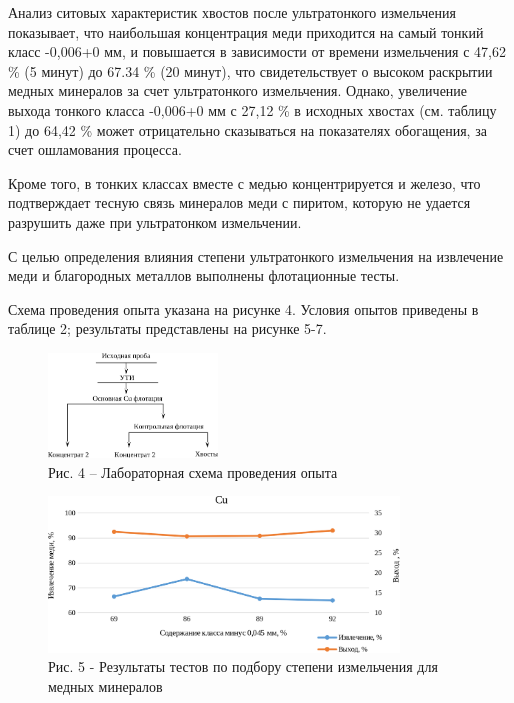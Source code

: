 \begin{multicols}{2}
Анализ ситовых характеристик хвостов после ультратонкого измельчения
показывает, что наибольшая концентрация меди приходится на самый тонкий
класс -0,006+0 мм, и повышается в зависимости от времени измельчения с
47,62 \% (5 минут) до 67.34 \% (20 минут), что свидетельствует о высоком
раскрытии медных минералов за счет ультратонкого измельчения. Однако,
увеличение выхода тонкого класса -0,006+0 мм с 27,12 \% в исходных
хвостах (см. таблицу 1) до 64,42 \% может отрицательно сказываться на
показателях обогащения, за счет ошламования процесса.

Кроме того, в тонких классах вместе с медью концентрируется и железо,
что подтверждает тесную связь минералов меди с пиритом, которую не
удается разрушить даже при ультратонком измельчении.

С целью определения влияния степени ультратонкого измельчения на
извлечение меди и благородных металлов выполнены флотационные тесты.

Схема проведения опыта указана на рисунке 4. Условия опытов приведены в
таблице 2; результаты представлены на рисунке 5-7.
\end{multicols}

\begin{figure}[H]
	\centering
	\includegraphics[width=0.4\textwidth]{assets/300.2}
	\caption*{Рис. 4 -- Лабораторная схема проведения опыта}
\end{figure}

\begin{figure}[H]
	\centering
	\includegraphics[width=0.83\textwidth]{assets/300.3}
	\caption*{Рис. 5 - Результаты тестов по подбору степени измельчения для
медных минералов}
\end{figure}

